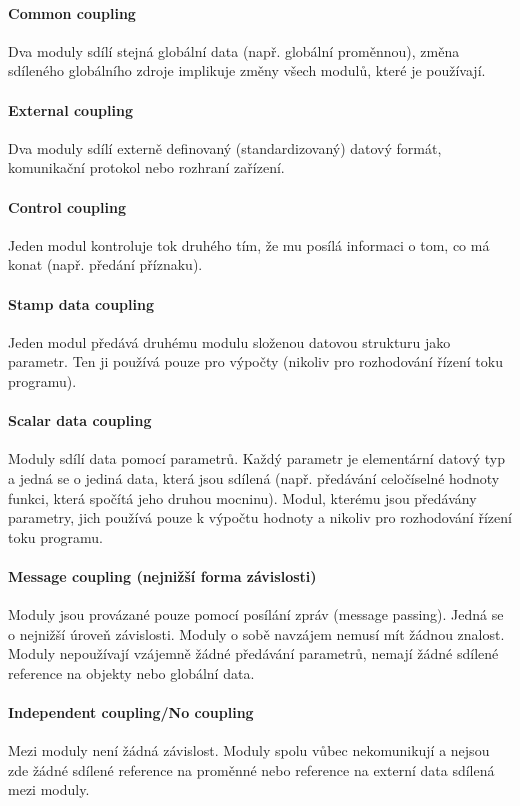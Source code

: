 \paragraph{Common coupling} Dva moduly sdílí stejná globální data (např. globální proměnnou), změna sdíleného globálního zdroje implikuje změny všech modulů, které je používají.

\paragraph{External coupling} Dva moduly sdílí externě definovaný (standardizovaný) datový formát, komunikační protokol nebo rozhraní zařízení.

\paragraph{Control coupling} Jeden modul kontroluje tok druhého tím, že mu posílá informaci o tom, co má konat (např. předání  příznaku).

\paragraph{Stamp data coupling} Jeden modul předává druhému modulu složenou datovou strukturu jako parametr. Ten ji používá pouze pro výpočty (nikoliv pro rozhodování řízení toku programu).

\paragraph{Scalar data coupling} Moduly sdílí data pomocí parametrů. Každý parametr je elementární datový typ a jedná se o jediná data, která jsou sdílená (např. předávání celočíselné hodnoty funkci, která spočítá jeho druhou mocninu). Modul, kterému jsou předávány parametry, jich používá pouze k výpočtu hodnoty a nikoliv pro rozhodování řízení toku programu.

\paragraph{Message coupling (nejnižší forma závislosti)} Moduly jsou provázané pouze pomocí posílání zpráv (message passing). Jedná se o nejnižší úroveň závislosti. Moduly o sobě navzájem nemusí mít žádnou znalost. Moduly nepoužívají vzájemně žádné předávání parametrů, nemají žádné sdílené reference na objekty nebo globální data.

\paragraph{Independent coupling/No coupling} Mezi moduly není žádná závislost. Moduly spolu vůbec nekomunikují a nejsou zde žádné sdílené reference na proměnné nebo reference na externí data sdílená mezi moduly.


